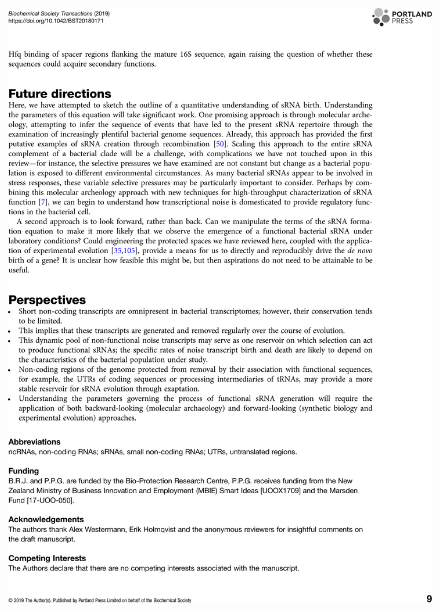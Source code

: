 \begin{figure}
    \centering
    \includegraphics[width=\linewidth]{lit_review/page9.png}
\end{figure}
